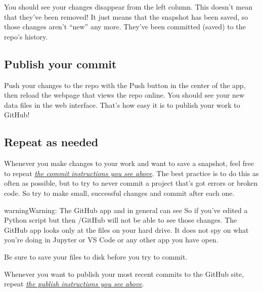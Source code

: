 \documentclass[letterpaper,10pt,english]{jupyterBook}
\begin{document}
\sphinxAtStartPar
You should see your changes disappear from the left column.  This doesn’t mean that they’ve been removed!  It just means that the snapshot has been saved, so those changes aren’t “new” any more.  They’ve been committed (saved) to the repo’s history.


\subsection{Publish your commit}
\label{\detokenize{chapter-8-version-control:publish-your-commit}}
\sphinxAtStartPar
Push your changes to the repo with the Push button in the center of the app, then reload the webpage that views the repo online.  You should see your new data files in the web interface.  That’s how easy it is to publish your work to GitHub!


\subsection{Repeat as needed}
\label{\detokenize{chapter-8-version-control:repeat-as-needed}}
\sphinxAtStartPar
Whenever you make changes to your work and want to save a snapshot, feel free to repeat {\hyperref[\detokenize{chapter-8-version-control:make-a-commit}]{\emph{the commit instructions you see above}}}.  The best practice is to do this as often as possible, but to try to never commit a project that’s got errors or broken code.  So try to make small, successful changes and commit after each one.

\begin{sphinxadmonition}{warning}{Warning:}
\sphinxAtStartPar
The GitHub app and  in general can see   So if you’ve edited a Python script but  then /GitHub will not be able to see those changes.  The GitHub app looks only at the files on your hard drive.  It does not spy on what you’re doing in Jupyter or VS Code or any other app you have open.

\sphinxAtStartPar
{}  Be sure to save your files to disk before you try to commit.
\end{sphinxadmonition}

\sphinxAtStartPar
Whenever you want to publish your most recent commits to the GitHub site, repeat {\hyperref[\detokenize{chapter-8-version-control:publish-your-commit}]{\emph{the publish instructions you see above}}}.
\end{document}
